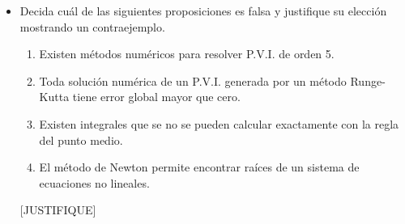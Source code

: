 \documentclass[11pt]{article}
\newcommand{\buena}{[BUENA]}
\newcommand{\justifique}{[JUSTIFIQUE]}
\begin{document}
\begin{itemize}
\item Decida cu\'al de las siguientes proposiciones es falsa y justifique su elecci\'on mostrando un contraejemplo.
\begin{enumerate}
	\item Existen m\'etodos num\'ericos para resolver P.V.I. de orden 5.
    \item \buena Toda soluci\'on num\'erica de un P.V.I. generada por un m\'etodo Runge-Kutta tiene error global mayor que cero.
    \item Existen integrales que se no se pueden calcular exactamente con la regla del punto medio.
    \item El método de Newton permite encontrar ra\'ices de un sistema de ecuaciones no lineales.
\end{enumerate}
\justifique 
\end{itemize}
\end{document}
